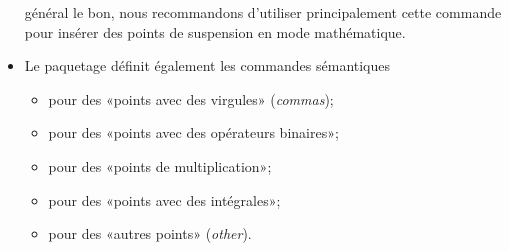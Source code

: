 \begin{itemize}
  général le bon, nous recommandons d'utiliser principalement cette
  commande pour insérer des points de suspension en mode mathématique.
\item Le paquetage  définit également les commandes sémantiques
  \begin{itemize}
  \item \cmd{\dotsc} pour des «points avec des virgules» (\emph{commas});
  \item \cmd{\dotsb} pour des «points avec des opérateurs binaires»;
  \item \cmd{\dotsm} pour des «points de multiplication»;
  \item \cmd{\dotsi} pour des «points avec des intégrales»;
  \item \cmd{\dotso} pour des «autres points» (\emph{other}).
  \end{itemize}
\end{itemize}

